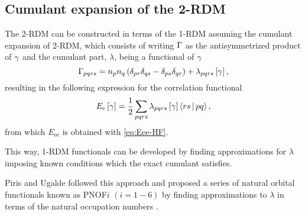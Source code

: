 \subsection{Cumulant expansion of the 2-RDM}
%
%
The 2-RDM can be constructed in terms of the 1-RDM assuming the cumulant
expansion of 2-RDM, which
consists of writing $\Gamma$ as the antisymmetrized product of $\gamma$ and
the cumulant part, $\lambda$, being a functional of $\gamma$ 
\begin{equation}
    \Gamma_{pqrs} =
    n_p n_q \left( \delta_{pr} \delta_{qs} - \delta_{ps} \delta_{qr} \right)
    + \lambda_{pqrs} \left[ \gamma \right]
    ,
\end{equation}
resulting in the following expression for the correlation functional 
\begin{equation}
    E_{\text{c}} \left[ \fordm \right]
    =
    \frac{1}{2} \sum_{pqrs} 
    \lambda_{pqrs} \left[ \fordm \right]
    \Braket{rs | pq}
    ,
\end{equation}
from which $E_{\text{ee}}$ is obtained with \cref{eq:Eee-HF}.

This way, 1-RDM functionals can be developed by finding
approximations for $ \lambda$ imposing known conditions which the exact
cumulant satisfies.


Piris and Ugalde followed this approach and proposed a series of natural orbital
functionals known as PNOF$i$ $\left( i=1-6 \right)$
by finding approximations to $\lambda$ in terms of the natural occupation numbers
.
